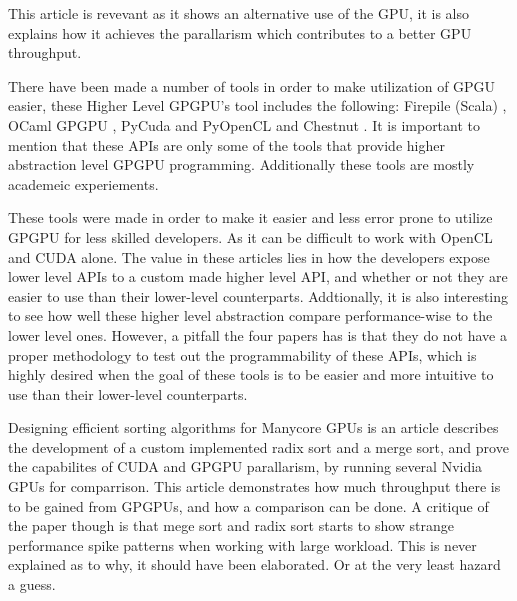 This article is revevant as it shows an alternative use of the \gls{GPU}, it is also explains how it achieves the parallarism which contributes to a better \gls{GPU} throughput.

There have been made a number of tools in order to make utilization of GPGU easier, these Higher Level GP\gls{GPU}'s tool includes the following: Firepile (Scala) \cite{2011_firepile}, OCaml GP\gls{GPU} \cite{bourgoin_2017_high}, PyCuda and PyOpenCL \cite{2012_pycuda_pyopencl} and Chestnut \cite{stromme_2012_chestnut}.
It is important to mention that these \glspl{API} are only some of the tools that provide higher abstraction level GPGPU programming. 
Additionally these tools are mostly academeic experiements.

These tools were made in order to make it easier and less error prone to utilize GP\gls{GPU} for less skilled developers. 
As it can be difficult to work with OpenCL and CUDA alone.
The value in these articles lies in how the developers expose lower level \glspl{API} to a custom made higher level \gls{API}, and whether or not they are easier to use than their lower-level counterparts. Addtionally, it is also interesting to see how well these higher level abstraction compare performance-wise to the lower level ones. However, a pitfall the four papers has is that they do not have a proper methodology to test out the programmability of these \glspl{API}, which is highly desired when the goal of these tools is to be easier and more intuitive to use than their lower-level counterparts.

Designing efficient sorting algorithms for Manycore \glspl{GPU} \cite{satish_2009_designing} is an article describes the development of a custom implemented radix sort and a merge sort, and prove the capabilites of CUDA and GPGPU parallarism, by running several Nvidia \glspl{GPU} for comparrison. 
This article demonstrates how much throughput there is to be gained from GP\glspl{GPU}, and how a comparison can be done. 
A critique of the paper though is that mege sort and radix sort starts to show strange performance spike patterns when working with large workload. 
This is never explained as to why, it should have been elaborated.
Or at the very least hazard a guess.

